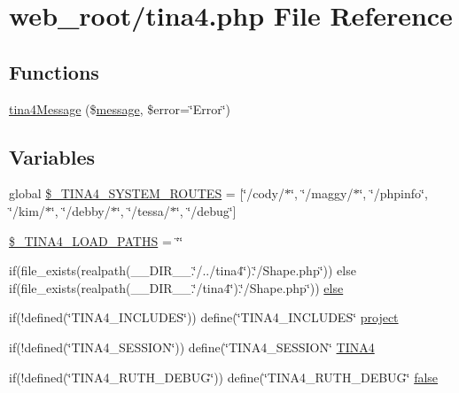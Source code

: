 \hypertarget{tina4_8php}{}\section{web\+\_\+root/tina4.php File Reference}
\label{tina4_8php}
\subsection*{Functions}
\begin{DoxyCompactItemize}
\item 
\hyperlink{tina4_8php_a58ad3c7e6ce35bedc420e4ae8d031aa0}{tina4\+Message} (\$\hyperlink{Tessa_8php_a37ab31c170417027f819bfc053d7cd39}{message}, \$error=\char`\"{}Error\char`\"{})
\end{DoxyCompactItemize}
\subsection*{Variables}
\begin{DoxyCompactItemize}
\item 
global \hyperlink{tina4_8php_aee4930dce4a7a4e58ff1deb77c5efe06}{\$\+\_\+\+T\+I\+N\+A4\+\_\+\+S\+Y\+S\+T\+E\+M\+\_\+\+R\+O\+U\+T\+E\+S} = \mbox{[}\char`\"{}/cody/$\ast$\char`\"{}, \char`\"{}/maggy/$\ast$\char`\"{}, \char`\"{}/phpinfo\char`\"{}, \char`\"{}/kim/$\ast$\char`\"{}, \char`\"{}/debby/$\ast$\char`\"{}, \char`\"{}/tessa/$\ast$\char`\"{}, \char`\"{}/debug\char`\"{}\mbox{]}
\item 
\hyperlink{tina4_8php_a3946343219802668d089aa324e037a71}{\$\+\_\+\+T\+I\+N\+A4\+\_\+\+L\+O\+A\+D\+\_\+\+P\+A\+T\+H\+S} = \char`\"{}\char`\"{}
\item 
if(file\+\_\+exists(realpath(\+\_\+\+\_\+\+D\+I\+R\+\_\+\+\_\+.\char`\"{}/../tina4\char`\"{}).\char`\"{}/Shape.\+php\char`\"{})) else if(file\+\_\+exists(realpath(\+\_\+\+\_\+\+D\+I\+R\+\_\+\+\_\+.\char`\"{}/tina4\char`\"{}).\char`\"{}/Shape.\+php\char`\"{})) \hyperlink{tina4_8php_a350389f83aef240942d13c10eeecde80}{else}
\item 
if(!defined(\char`\"{}T\+I\+N\+A4\+\_\+\+I\+N\+C\+L\+U\+D\+E\+S\char`\"{})) define(\char`\"{}T\+I\+N\+A4\+\_\+\+I\+N\+C\+L\+U\+D\+E\+S\char`\"{} \hyperlink{tina4_8php_af44e53807735b3a9307a735cbac46e03}{project}
\item 
if(!defined(\char`\"{}T\+I\+N\+A4\+\_\+\+S\+E\+S\+S\+I\+O\+N\char`\"{})) define(\char`\"{}T\+I\+N\+A4\+\_\+\+S\+E\+S\+S\+I\+O\+N\char`\"{} \hyperlink{tina4_8php_ad21384bf3005ff979361b5fb4054b763}{T\+I\+N\+A4}
\item 
if(!defined(\char`\"{}T\+I\+N\+A4\+\_\+\+R\+U\+T\+H\+\_\+\+D\+E\+B\+U\+G\char`\"{})) define(\char`\"{}T\+I\+N\+A4\+\_\+\+R\+U\+T\+H\+\_\+\+D\+E\+B\+U\+G\char`\"{} \hyperlink{tina4_8php_aec2deb5590a84bee262c3bea206ae88f}{false}
\end{DoxyCompactItemize}


